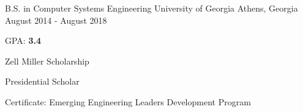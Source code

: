 \begin{cventries}
  \cventry
    {B.S. in Computer Systems Engineering}
    {University of Georgia}
    {Athens, Georgia}
    {August 2014 - August 2018}
    {
      \begin{cvitems}
        \item {GPA: \textbf{3.4}}
        \item {Zell Miller Scholarship}
        \item {Presidential Scholar}
        \item {Certificate: Emerging Engineering Leaders Development Program}
      \end{cvitems}
    }
\end{cventries}
